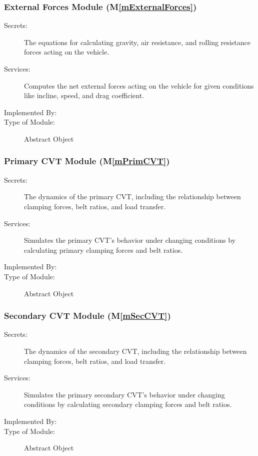 \documentclass[12pt, titlepage]{article}
\newcommand{\mref}[1]{M\ref{#1}}
\begin{document}
\subsubsection{External Forces Module (\mref{mExternalForces})}

\begin{description}
\item[Secrets:] The equations for calculating gravity, air resistance, and rolling resistance forces acting on the vehicle.
\item[Services:] Computes the net external forces acting on the vehicle for given conditions like incline, speed, and drag coefficient.
\item[Implemented By:] \progname{}
\item[Type of Module:] Abstract Object
\end{description}

\subsubsection{Primary CVT Module (\mref{mPrimCVT})}

\begin{description}
\item[Secrets:] The dynamics of the primary CVT, including the relationship between clamping forces, belt ratios, and load transfer.
\item[Services:] Simulates the primary CVT's behavior under changing conditions by calculating primary clamping forces and belt ratios.
\item[Implemented By:] \progname{}
\item[Type of Module:] Abstract Object
\end{description}

\subsubsection{Secondary CVT Module (\mref{mSecCVT})}

\begin{description}
\item[Secrets:] The dynamics of the secondary CVT, including the relationship between clamping forces, belt ratios, and load transfer.
\item[Services:] Simulates the primary secondary CVT's behavior under changing conditions by calculating secondary clamping forces and belt ratios.
\item[Implemented By:] \progname{}
\item[Type of Module:] Abstract Object
\end{description}
\end{document}
